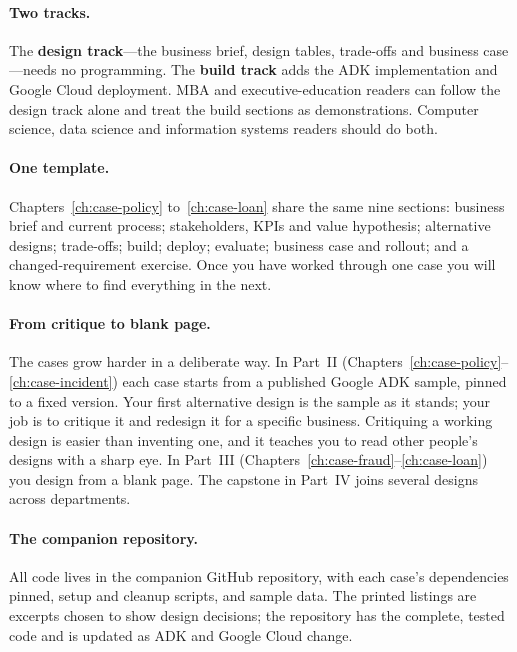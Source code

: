 \paragraph{Two tracks.} The \textbf{design track}---the business brief, design tables, trade-offs and business case---needs no programming. The \textbf{build track} adds the ADK implementation and Google Cloud deployment. MBA and executive-education readers can follow the design track alone and treat the build sections as demonstrations. Computer science, data science and information systems readers should do both.

\paragraph{One template.} Chapters~\ref{ch:case-policy} to~\ref{ch:case-loan} share the same nine sections: business brief and current process; stakeholders, KPIs and value hypothesis; alternative designs; trade-offs; build; deploy; evaluate; business case and rollout; and a changed-requirement exercise. Once you have worked through one case you will know where to find everything in the next.

\paragraph{From critique to blank page.} The cases grow harder in a deliberate way. In Part~II (Chapters~\ref{ch:case-policy}--\ref{ch:case-incident}) each case starts from a published Google ADK sample, pinned to a fixed version. Your first alternative design is the sample as it stands; your job is to critique it and redesign it for a specific business. Critiquing a working design is easier than inventing one, and it teaches you to read other people's designs with a sharp eye. In Part~III (Chapters~\ref{ch:case-fraud}--\ref{ch:case-loan}) you design from a blank page. The capstone in Part~IV joins several designs across departments.

\paragraph{The companion repository.} All code lives in the companion GitHub repository, with each case's dependencies pinned, setup and cleanup scripts, and sample data. The printed listings are excerpts chosen to show design decisions; the repository has the complete, tested code and is updated as ADK and Google Cloud change.

